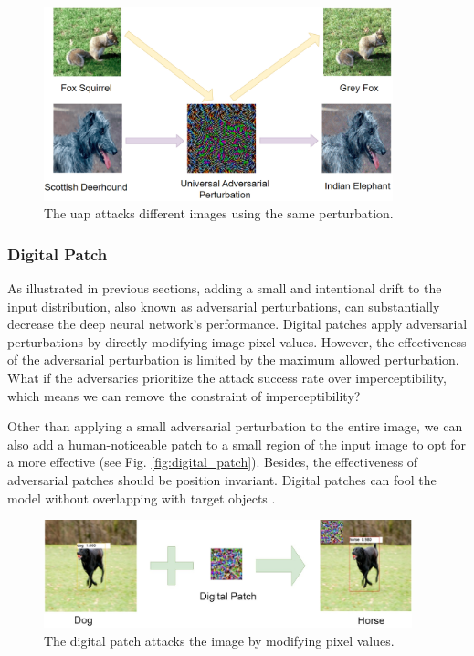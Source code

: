 \begin{figure}[H]
\centering
\includegraphics[width=0.9\textwidth]{figures/chapter_intro/uap.png}
\caption{The \acrfull{uap} attacks different images using the same perturbation.}
\label{fig.uap}
\end{figure}


\subsubsection{Digital Patch}

As illustrated in previous sections, adding a small and intentional drift to the input distribution, also known as adversarial perturbations, can substantially decrease the deep neural network's performance. Digital patches apply adversarial perturbations by directly modifying image pixel values. However, the effectiveness of the adversarial perturbation is limited by the maximum allowed perturbation. What if the adversaries prioritize the attack success rate over imperceptibility, which means we can remove the constraint of imperceptibility?

Other than applying a small adversarial perturbation to the entire image, we can also add a human-noticeable patch to a small region of the input image to opt for a more effective (see Fig. \ref{fig:digital_patch}). Besides, the effectiveness of adversarial patches should be position invariant. Digital patches can fool the model without overlapping with target objects \citep{saha2020role}.


\begin{figure}[H]
\centering
\includegraphics[width=0.95\textwidth]{figures/chapter_intro/digital_patch.jpg}
\caption{The digital patch attacks the image by modifying pixel values.}
\label{fig.digital_patch}
\end{figure}


